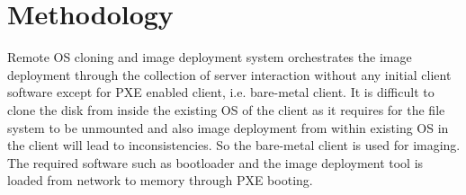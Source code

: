 \documentclass[a4paper,12pt]{article}
\begin{document}


\newpage
\section{\fontsize{16pt}{1em} Methodology}
Remote OS cloning and image deployment system orchestrates the image deployment through the collection of server interaction without any initial client software except for PXE enabled client, i.e. bare-metal client. It is difficult to clone the disk from inside the existing  OS of the client as it requires for the file system to be unmounted and also image deployment from within existing OS in the client will lead to inconsistencies. So the bare-metal client is used for imaging. The required software such as bootloader and the image deployment tool is loaded from network to memory through PXE booting.
\end{document}

